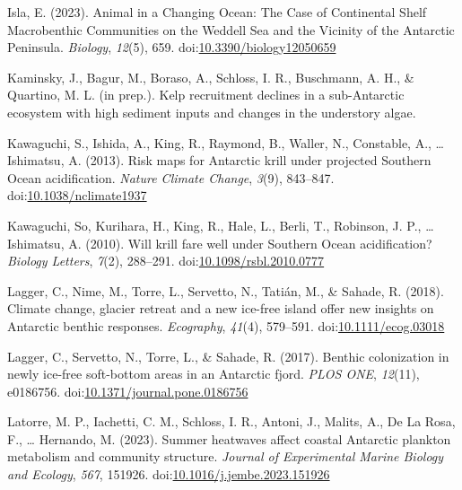 \documentclass[
]{article}
\newlength{\cslhangindent}
\newenvironment{CSLReferences}[2] %
 {\begin{list}{}{%
  \setlength{\itemindent}{0pt}
  \setlength{\leftmargin}{0pt}
  \setlength{\parsep}{0pt}
  \ifodd #1
   \setlength{\leftmargin}{\cslhangindent}
   \setlength{\itemindent}{-1\cslhangindent}
  \fi
  \setlength{\itemsep}{#2\baselineskip}}}
 {\end{list}}
\begin{document}
\begin{CSLReferences}{1}{0}
Isla, E. (2023). Animal in a
{Changing Ocean}: {The Case} of {Continental Shelf Macrobenthic
Communities} on the {Weddell Sea} and the {Vicinity} of the {Antarctic
Peninsula}. \emph{Biology}, \emph{12}(5), 659.
doi:\href{https://doi.org/10.3390/biology12050659}{10.3390/biology12050659}

Kaminsky, J., Bagur, M., Boraso, A., Schloss, I. R., Buschmann, A. H.,
\& Quartino, M. L. (in prep.). Kelp recruitment declines in a
sub-{Antarctic} ecosystem with high sediment inputs and changes in the
understory algae.

Kawaguchi, S., Ishida, A., King, R., Raymond, B., Waller, N., Constable,
A., \ldots{} Ishimatsu, A. (2013). Risk maps for {Antarctic} krill under
projected {Southern Ocean} acidification. \emph{Nature Climate Change},
\emph{3}(9), 843--847.
doi:\href{https://doi.org/10.1038/nclimate1937}{10.1038/nclimate1937}

Kawaguchi, So, Kurihara, H., King, R., Hale, L., Berli, T., Robinson, J.
P., \ldots{} Ishimatsu, A. (2010). Will krill fare well under {Southern
Ocean} acidification? \emph{Biology Letters}, \emph{7}(2), 288--291.
doi:\href{https://doi.org/10.1098/rsbl.2010.0777}{10.1098/rsbl.2010.0777}

Lagger, C., Nime, M., Torre, L., Servetto, N., Tatián, M., \& Sahade, R.
(2018). Climate change, glacier retreat and a new ice-free island offer
new insights on {Antarctic} benthic responses. \emph{Ecography},
\emph{41}(4), 579--591.
doi:\href{https://doi.org/10.1111/ecog.03018}{10.1111/ecog.03018}

Lagger, C., Servetto, N., Torre, L., \& Sahade, R. (2017). Benthic
colonization in newly ice-free soft-bottom areas in an {Antarctic}
fjord. \emph{PLOS ONE}, \emph{12}(11), e0186756.
doi:\href{https://doi.org/10.1371/journal.pone.0186756}{10.1371/journal.pone.0186756}

Latorre, M. P., Iachetti, C. M., Schloss, I. R., Antoni, J., Malits, A.,
De La Rosa, F., \ldots{} Hernando, M. (2023). Summer heatwaves affect
coastal {Antarctic} plankton metabolism and community structure.
\emph{Journal of Experimental Marine Biology and Ecology}, \emph{567},
151926.
doi:\href{https://doi.org/10.1016/j.jembe.2023.151926}{10.1016/j.jembe.2023.151926}


\end{CSLReferences}
\end{document}
